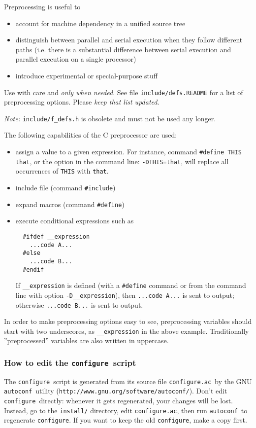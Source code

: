 \documentclass[12pt,a4paper]{article}
\def\configure{\texttt{configure}}
\def\configurac{\texttt{configure.ac}}
\def\autoconf{\texttt{autoconf}}
\begin{document}
Preprocessing is useful to
\begin{itemize}
\item account for machine dependency in a unified source tree
\item distinguish between parallel and serial execution when they
follow different paths (i.e. there is a substantial difference between
serial execution and parallel execution on a single processor)
\item  introduce experimental or special-purpose stuff
\end{itemize}
Use with care and {\em only when needed}. See file 
\texttt{include/defs.README} for a list of preprocessing 
options. Please {\em keep that list updated}.

{\em Note:} \texttt{include/f\_defs.h} is obsolete and
must not be used any longer.

The following capabilities of the C preprocessor are used:
\begin{itemize}
\item assign a value to a given expression. For instance, command
  \texttt{\#define THIS that}, or the option in the command line:
  \texttt{-DTHIS=that}, will replace all occurrences of \texttt{THIS}
  with \texttt{that}. 
\item include file (command \texttt{\#include})
\item expand macros (command \texttt{\#define})
\item execute conditional expressions such as
\begin{verbatim}
  #ifdef __expression
    ...code A...
  #else
    ...code B...
  #endif
\end{verbatim}
If \texttt{\_\_expression} is defined (with a \texttt{\#define} command
or from the command line with option \texttt{-D\_\_expression}), 
then  \texttt{...code A...} is sent to output; otherwise 
\texttt{...code B...} is sent to output.

\end{itemize}
In order to make  preprocessing options
easy to see, preprocessing variables should start with  
two underscores, as \texttt{\_\_expression} in the above
example. Traditionally ''preprocessed'' variables are also written in
uppercase. 

\subsubsection{How to edit the \configure\ script}

\label{SubSec:conf}
The \configure\ script is generated from its source file
\configurac\ by the GNU \autoconf\ utility
(\texttt{http://www.gnu.org/software/autoconf/}).  Don't edit \configure\
directly: whenever it gets regenerated, your changes will be lost.
Instead, go to the \texttt{install/} directory, edit \configurac, 
then run \autoconf\ to regenerate \configure. If you want 
to keep the old \configure, make a copy
first.
\end{document}
